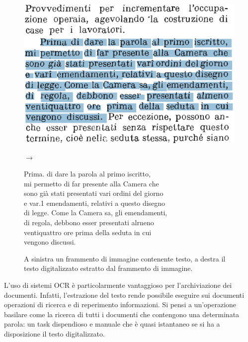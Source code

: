 \begin{figure}[H]
\centering
{
\begin{minipage}{0.4\textwidth}
\includegraphics[width=\textwidth]{immagini/metodologia/ocr_ex.png}
\end{minipage} \hfill
\begin{minipage}{0.06\textwidth}
\Large$\rightarrow$
\end{minipage}
\begin{minipage}{0.5\textwidth}
\footnotesize	
Prima. di dare la parola al primo iscritto, \\
mi permetto di far presente alla Camera che \\
sono già stati presentati vari ordini del giorno \\
e var.1 emendamenti, relativi a questo disegno \\
di legge. Come la Camera sa, gli emendamenti, \\
di regola, debbono esser presentati alrneno \\
ventiquattro ore prima della seduta in cui \\
vengono discussi.
\end{minipage}
\caption{A sinistra un frammento di immagine contenente testo, a destra il testo digitalizzato estratto dal frammento di immagine.}
\label{fig:met_ocr_esempio}
}
\end{figure}

L'uso di sistemi OCR è particolarmente vantaggioso per l'archiviazione dei documenti. Infatti, l'estrazione del testo rende possibile eseguire sui documenti operazioni di ricerca e di reperimento informazioni. Si pensi a un'operazione basilare come la ricerca di tutti i documenti che contengono una determinata parola: un task dispendioso e manuale che è quasi istantaneo se si ha a disposizione il testo digitalizzato.
